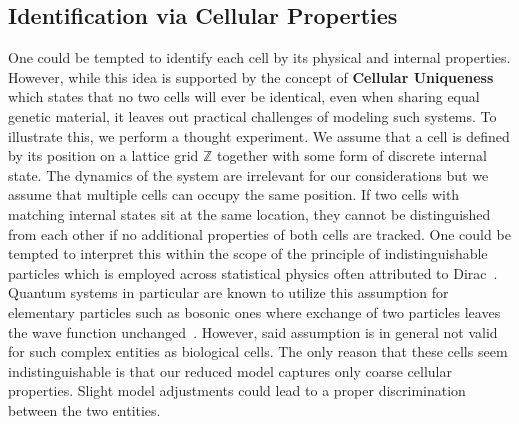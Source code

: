 \subsection{Identification via Cellular Properties}
One could be tempted to identify each cell by its physical and internal properties.
However, while this idea is supported by the concept of \textbf{Cellular Uniqueness} which states
that no two cells will ever be identical, even when sharing equal genetic material, it leaves out
practical challenges of modeling such systems.
To illustrate this, we perform a thought experiment.
We assume that a cell is defined by its position on a lattice grid $\mathbb{Z}$ together with some
form of discrete internal state.
The dynamics of the system are irrelevant for our considerations but we assume that multiple cells
can occupy the same position.
If two cells with matching internal states sit at the same location, they cannot be
distinguished from each other if no additional properties of both cells are tracked.
One could be tempted to interpret this within the scope of the principle of indistinguishable
particles which is employed across statistical physics often attributed to Dirac~\cite{Dirac1926}.
Quantum systems in particular are known to utilize this assumption for elementary particles such as
bosonic ones where exchange of two particles leaves the wave function
unchanged~\cite{Griffiths2018}.
However, said assumption is in general not valid for such complex entities as biological cells.
The only reason that these cells seem indistinguishable is that our reduced model captures only
coarse cellular properties.
Slight model adjustments could lead to a proper discrimination between the two entities.

%     

